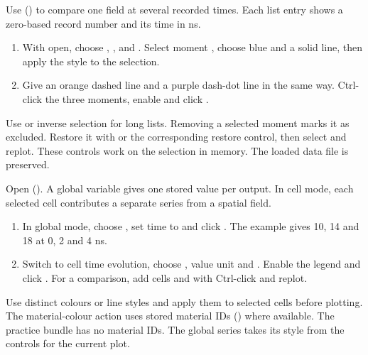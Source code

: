 Use  () to compare one field at several recorded times. Each list entry shows a zero-based record number and its time in ns.
\begin{enumerate}
\item With  open, choose , ,  and . Select moment , choose blue and a solid line, then apply the style to the selection.
\item Give  an orange dashed line and  a purple dash-dot line in the same way. Ctrl-click the three moments, enable  and click .
\end{enumerate}
Use  or inverse selection for long lists. Removing a selected moment marks it as excluded. Restore it with  or the corresponding restore control, then select and replot. These controls work on the selection in memory. The loaded data file is preserved.

Open  (). A global variable gives one stored value per output. In cell mode, each selected cell contributes a separate series from a spatial field.
\begin{enumerate}
\item In global mode, choose , set time to  and click . The example gives 10, 14 and 18 at 0, 2 and 4 ns.
\item Switch to cell time evolution, choose , value unit  and . Enable the legend and click . For a comparison, add cells  and  with Ctrl-click and replot.
\end{enumerate}
Use distinct colours or line styles and apply them to selected cells before plotting. The material-colour action uses stored material IDs () where available. The practice bundle has no material IDs. The global series takes its style from the controls for the current plot.

